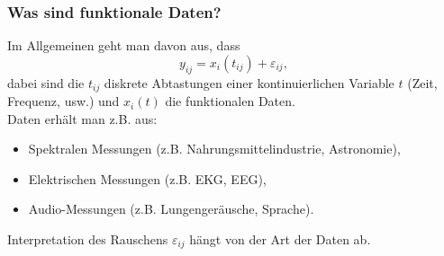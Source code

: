 \documentclass[xcolor=dvipsnames, compress, serif, professionalfont, handout]{beamer}
\begin{document}
%
%

\begin{frame}[fragile]
  \frametitle{Was sind funktionale Daten?}
  Im Allgemeinen geht man davon aus, dass 
  $$
    y_{ij} = x_i(t_{ij}) + \varepsilon_{ij},
  $$
  dabei sind die $t_{ij}$ diskrete Abtastungen einer kontinuierlichen Variable $t$
  (Zeit, Frequenz, usw.) und $x_i(t)$ die funktionalen Daten.\\
  \pause Daten erh\"alt man z.B. aus:
  \begin{itemize}
    \item Spektralen Messungen (z.B. Nahrungsmittelindustrie, Astronomie),
    \item Elektrischen Messungen (z.B. EKG, EEG),
    \item Audio-Messungen (z.B. Lungenger\"ausche, Sprache).
  \end{itemize}
  \pause Interpretation des Rauschens $\varepsilon_{ij}$ h\"angt von der Art der 
  Daten ab.
\end{frame}

%
%
\end{document}
